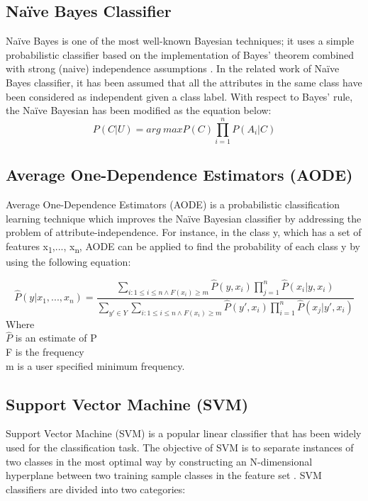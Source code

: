 \documentclass[review]{elsarticle}
\begin{document}
\subsection{Na\"ive Bayes Classifier}
\label{subsec:Naive}
Na\"ive Bayes is one of the most well-known Bayesian techniques; it uses a simple probabilistic classifier based on the implementation of Bayes' theorem combined with strong (naive) independence assumptions \cite{Lowd2005}. In the related work of Na\"ive Bayes classifier, it has been assumed that all the attributes in the same class have been considered as independent given a class label. With respect to Bayes’ rule, the Na\"ive Bayesian has been modified as the equation below:
 	\begin{equation}
 	P(C|U) = arg\ max P(C) \prod_{i=1}^n P(A_i|C)
 	\label{eq:Naive}
 	\end{equation}
\subsection{Average One-Dependence Estimators (AODE)}
\label{subsec:AODE}
Average One-Dependence Estimators (AODE) is a probabilistic classification learning technique which improves the Na\"ive Bayesian classifier \cite{Webb2005} by addressing the problem of attribute-independence. For instance, in the class y, which has a set of features x\textsubscript{1},..., x\textsubscript{n}, AODE can be applied to find the probability of each class y by using the following equation:

\begin{equation}
\hat{P}(y|x_1,...,x_n) = \dfrac{\sum_{i:1\leq i\leq n \wedge F(x_i) \geq m} \hat{P}(y,x_i)\prod_{j=1}^n \hat{P}(x_i|y,x_i)}{ \sum_{y'\in Y}  \sum_{i:1\leq i\leq n \wedge F(x_i) \geq m} \hat{P}(y',x_i) \prod_{i=1}^n \hat{P}(x_j|y',x_i) }
\label{AODE}
\end{equation}
Where \\
$\hat{P}$ is an estimate of P \\
F  is the frequency \\
m is a user specified minimum frequency.
	
\subsection{Support Vector Machine (SVM)}
\label{subsec:SVM}
Support Vector Machine (SVM) is a popular linear classifier that has been widely used for the classification task. The objective of SVM is to separate instances of two classes in the most optimal way by constructing an N-dimensional hyperplane between two training sample classes in the feature set \cite{Cortes1995}. SVM classifiers are divided into two categories: \\
\end{document}
